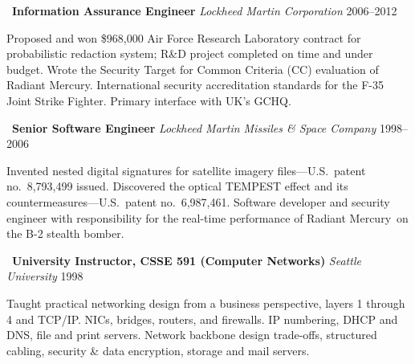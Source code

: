 \vspace{1.5mm}
\noindent\textbullet\ \textbf{Information Assurance Engineer}
    \hfill \emph{Lockheed Martin Corporation} \hfill 2006--2012

    \vspace{1mm}
    \noindent Proposed and won \$968,000 Air Force Research Laboratory
    contract for probabilistic redaction system; R\&D
    project completed on time and under budget. Wrote the
    Security Target for Common Criteria (CC) evaluation of Radiant
    Mercury\rmtrademark. International security
    accreditation standards for the F-35 Joint Strike Fighter.
    Primary interface with UK's GCHQ.

\vspace{1.5mm}
\noindent\textbullet\ \textbf{Senior Software Engineer}
    \hfill \emph{Lockheed Martin Missiles \& Space Company} \hfill 1998--2006

    \vspace{1mm}
    \noindent Invented nested digital signatures for satellite imagery
    files---U.S.\ patent no.~8,793,499 issued. Discovered the
    optical TEMPEST effect and its countermeasures---U.S.\ patent
    no.~6,987,461. Software developer and security engineer with
    responsibility for the real-time performance of Radiant
    Mercury\rmtrademark\ on the B-2 stealth bomber.

\vspace{1.5mm}
\noindent\textbullet\ \textbf{University Instructor, CSSE 591 (Computer Networks)}
    \hfill \emph{Seattle University} \hfill 1998

    \vspace{1mm}
    \noindent Taught practical networking design from a business perspective, layers
    1 through 4 and TCP/IP. NICs, bridges, routers, and firewalls.
    IP numbering, DHCP and DNS, file and print servers. Network
    backbone design trade-offs, structured cabling, security \& data
    encryption, storage and mail servers.

